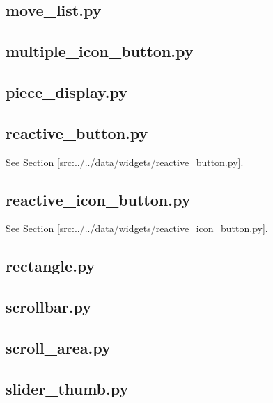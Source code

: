 \documentclass[../main/main.tex]{subfiles}
\begin{document}
\subsection{move\_list.py}

\label{src:data/widgets/move_list.py}

\subsection{multiple\_icon\_button.py}

\label{src:data/widgets/multiple_icon_button.py}

\subsection{piece\_display.py}

\label{src:data/widgets/piece_display.py}

\subsection{reactive\_button.py}
See Section \ref{src:../../data/widgets/reactive_button.py}.

\subsection{reactive\_icon\_button.py}
See Section \ref{src:../../data/widgets/reactive_icon_button.py}.

\subsection{rectangle.py}

\label{src:data/widgets/rectangle.py}

\subsection{scrollbar.py}

\label{src:data/widgets/scrollbar.py}

\subsection{scroll\_area.py}

\label{src:data/widgets/scroll_area.py}

\subsection{slider\_thumb.py}

\label{src:data/widgets/slider_thumb.py}
\end{document}
